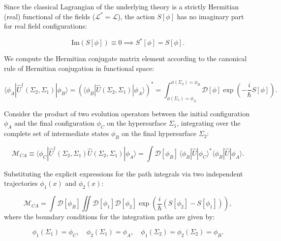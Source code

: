 \documentclass[11pt,a4paper]{article}
\theoremstyle{definition}
\begin{document}
Since the classical Lagrangian of the underlying theory is a strictly Hermitian (real) functional of the fields ($\mathcal{L}^* = \mathcal{L}$), the action $S[\phi]$ has no imaginary part for real field configurations:

\begin{equation}\label{eq:1.77}\tag{1.77}
\text{Im}(S[\phi]) \equiv 0 \implies S^*[\phi] = S[\phi].
\end{equation}

We compute the Hermitian conjugate matrix element according to the canonical rule of Hermitian conjugation in functional space:

\begin{equation}\label{eq:1.78}\tag{1.78}
\langle \phi_A | \hat{U}^\dagger(\Sigma_2, \Sigma_1) | \phi_B \rangle = \left( \langle \phi_B | \hat{U}(\Sigma_2, \Sigma_1) | \phi_A \rangle \right)^* = \int_{\phi(\Sigma_1)=\phi_A}^{\phi(\Sigma_2)=\phi_B} \mathcal{D}[\phi] \exp\left( -\frac{i}{\hbar} S[\phi] \right).
\end{equation}

Consider the product of two evolution operators between the initial configuration $\phi_A$ and the final configuration $\phi_C$ on the hypersurface $\Sigma_1$, integrating over the complete set of intermediate states $\phi_B$ on the final hypersurface $\Sigma_2$:

\begin{equation}\label{eq:1.79}\tag{1.79}
\mathcal{M}_{CA} \equiv \langle \phi_C | \hat{U}^\dagger(\Sigma_2, \Sigma_1) \hat{U}(\Sigma_2, \Sigma_1) | \phi_A \rangle = \int \mathcal{D}[\phi_B] \, \langle \phi_B | \hat{U} | \phi_C \rangle^* \langle \phi_B | \hat{U} | \phi_A \rangle.
\end{equation}

Substituting the explicit expressions for the path integrals via two independent trajectories $\phi_1(x)$ and $\phi_2(x)$:

\begin{equation}\label{eq:1.80}\tag{1.80}
\mathcal{M}_{CA} = \int \mathcal{D}[\phi_B] \iint \mathcal{D}[\phi_1] \mathcal{D}[\phi_2] \exp\left( \frac{i}{\hbar} \left( S[\phi_2] - S[\phi_1] \right) \right),
\end{equation}
where the boundary conditions for the integration paths are given by:

\begin{equation*}
\phi_1(\Sigma_1) = \phi_C, \quad \phi_2(\Sigma_1) = \phi_A, \quad \phi_1(\Sigma_2) = \phi_2(\Sigma_2) = \phi_B.
\end{equation*}
\end{document}
